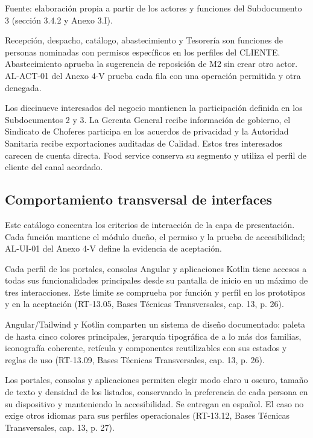 {\fontsize{9pt}{11pt}\selectfont\raggedright Fuente: elaboración propia a partir de los actores y funciones del Subdocumento 3 (sección 3.4.2 y Anexo 3.I).\par}

Recepción, despacho, catálogo, abastecimiento y Tesorería son funciones de personas nominadas con permisos específicos en los perfiles del CLIENTE. Abastecimiento aprueba la sugerencia de reposición de M2 sin crear otro actor. AL-ACT-01 del Anexo 4-V prueba cada fila con una operación permitida y otra denegada.

Los diecinueve interesados del negocio mantienen la participación definida en los Subdocumentos 2 y 3. La Gerenta General recibe información de gobierno, el Sindicato de Choferes participa en los acuerdos de privacidad y la Autoridad Sanitaria recibe exportaciones auditadas de Calidad. Estos tres interesados carecen de cuenta directa. Food service conserva su segmento y utiliza el perfil de cliente del canal acordado.

\label{anxN:interaccion}
\subsection*{Comportamiento transversal de interfaces}
Este catálogo concentra los criterios de interacción de la capa de presentación. Cada función mantiene el módulo dueño, el permiso y la prueba de accesibilidad; AL-UI-01 del Anexo 4-V define la evidencia de aceptación.

Cada perfil de los portales, consolas Angular y aplicaciones Kotlin tiene accesos a todas sus funcionalidades principales desde su pantalla de inicio en un máximo de tres interacciones. Este límite se comprueba por función y perfil en los prototipos y en la aceptación (RT-13.05, Bases Técnicas Transversales, cap. 13, p. 26).

Angular/Tailwind y Kotlin comparten un sistema de diseño documentado: paleta de hasta cinco colores principales, jerarquía tipográfica de a lo más dos familias, iconografía coherente, retícula y componentes reutilizables con sus estados y reglas de uso (RT-13.09, Bases Técnicas Transversales, cap. 13, p. 26).

Los portales, consolas y aplicaciones permiten elegir modo claro u oscuro, tamaño de texto y densidad de los listados, conservando la preferencia de cada persona en su dispositivo y manteniendo la accesibilidad. Se entregan en español. El caso no exige otros idiomas para sus perfiles operacionales (RT-13.12, Bases Técnicas Transversales, cap. 13, p. 27).

